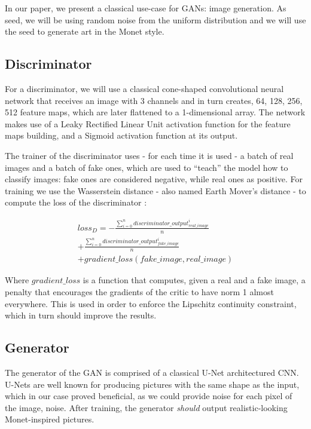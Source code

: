 \documentclass[conference]{IEEEtran}
\begin{document}
    In our paper, we present a classical use-case for GANs: image generation. As seed, we will be using random noise from
the uniform distribution and we will use the seed to generate art in the Monet style.

\subsection{Discriminator}
    For a discriminator, we will use a classical cone-shaped convolutional neural network that receives an image with 3 channels
and in turn creates, 64, 128, 256, 512 feature maps, which are later flattened to a 1-dimensional array. The network makes use
of a Leaky Rectified Linear Unit activation function for the feature maps building, and a Sigmoid activation function at its
output.

    The trainer of the discriminator uses - for each time it is used - a batch of real images and a batch of fake ones, which are used
to ``teach'' the model how to classify images: fake ones are considered negative, while real ones as positive. For training we use
the Wasserstein distance - also named Earth Mover's distance - to compute the loss of the discriminator \cite{b2}:

\begin{multline}
    loss_{D} = - \frac{\sum_{i=0}^{n} discriminator\_output_{real\_image}^i}{n} \\
               + \frac{\sum_{i=0}^{n} discriminator\_output_{fake\_image}^i}{n} \\
               + gradient\_loss(fake\_image, real\_image)
\end{multline}

    Where $gradient\_loss$ is a function that computes, given a real and a fake image, a penalty that encourages the gradients
of the critic to have norm 1 almost everywhere. This is used in order to enforce the Lipschitz continuity constraint, which
in turn should improve the results.

\subsection{Generator}
    The generator of the GAN is comprised of a classical U-Net architectured CNN. U-Nets are well known for producing pictures
with the same shape as the input, which in our case proved beneficial, as we could provide noise for each pixel of the image,
noise. After training, the generator \textit{should} output realistic-looking Monet-inspired pictures.
\end{document}
